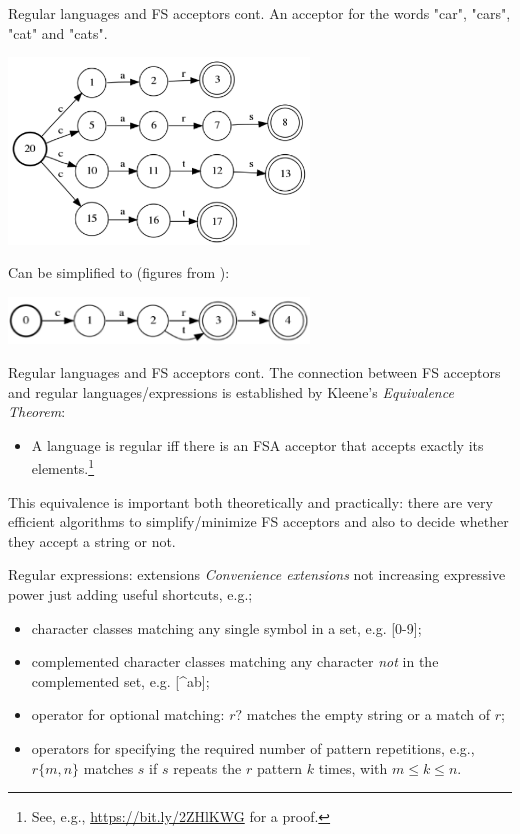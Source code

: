 \documentclass[style=upen, size=14pt]{powerdot}
\newcommand{\gold}{\color{arany}}
\theoremstyle{definition}
\begin{document}
\begin{slide}[toc=]{Regular languages and FS acceptors cont.}
  An acceptor for the words "car", "cars", "cat" and "cats".
  \begin{center}
    \includegraphics[width=0.6\textwidth]{figures/fsa1.eps}
  \end{center}
  Can be simplified to (figures from \cite{buutbogel2009fsmorph}):
  \begin{center}
    \includegraphics[width=0.6\textwidth]{figures/fsa2.eps}
  \end{center}
\end{slide}

\begin{slide}[toc=]{Regular languages and FS acceptors cont.}
  The connection between FS acceptors and regular languages/expressions is
  established by Kleene's \emph{\gold Equivalence Theorem}:
  \begin{itemize}
  \item A language is regular iff there is an FSA acceptor that accepts exactly
    its elements.\footnote{See, e.g.,
      \href{https://bit.ly/2ZHlKWG}{https://bit.ly/2ZHlKWG} for a proof.}
  \end{itemize}
  This equivalence is important both theoretically and practically: there are
  very efficient algorithms to simplify/minimize FS acceptors and also to decide
  whether they accept a string or not.
\end{slide}

\begin{slide}[toc=]{Regular expressions: extensions}
  \emph{\gold Convenience extensions} not increasing expressive power just adding useful
  shortcuts, e.g.;
  \begin{itemize}
  \item character classes matching any single symbol in a set, e.g. [0-9];
  \item complemented character classes matching any character \emph{not} in the
    complemented set, e.g. [\^{}ab];
  \item operator for optional  matching: $r?$ matches the empty string or a match of $r$;
  \item operators for specifying the required number of pattern repetitions,
    e.g., $r\{m,n\}$ matches $s$ if $s$ repeats the $r$ pattern $k$ times, with
    $m\leq k \leq n$.
  \end{itemize}
\end{slide}
\end{document}
